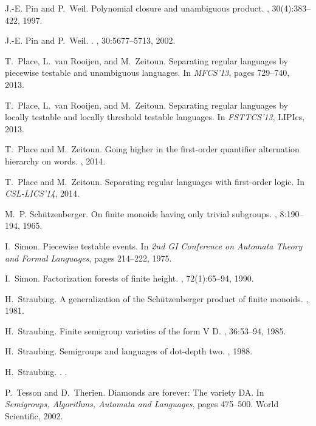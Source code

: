 \documentclass[envcountsame]{llncs}
\newcommand*{\swap}[2]{#2#1}
\begin{document}
\begin{thebibliography}{10}
J.-E. Pin and P.~Weil.
\newblock Polynomial closure and unambiguous product.
, 30(4):383--422, 1997.

J.-E. Pin and P.~Weil.
.
, 30:5677--5713, 2002.

T.~Place, L.~{\swap{Rooijen}{van }}, and M.~Zeitoun.
\newblock Separating regular languages by piecewise testable and unambiguous
  languages.
\newblock In {\em MFCS'13}, pages 729--740, 2013.

T.~Place, L.~van Rooijen, and M.~Zeitoun.
\newblock Separating regular languages by locally testable and locally
  threshold testable languages.
\newblock In {\em FSTTCS'13}, LIPIcs, 2013.

T.~Place and M.~Zeitoun.
\newblock Going higher in the first-order quantifier alternation hierarchy on
  words.
, 2014.

T.~Place and M.~Zeitoun.
\newblock Separating regular languages with first-order logic.
\newblock In {\em CSL-LICS'14}, 2014.

M.~P. Sch{\"u}tzenberger.
\newblock On finite monoids having only trivial subgroups.
, 8:190--194, 1965.

I.~Simon.
\newblock Piecewise testable events.
\newblock In {\em 2nd GI Conference on Automata Theory and Formal Languages},
  pages 214--222, 1975.

I.~Simon.
\newblock Factorization forests of finite height.
, 72(1):65--94, 1990.

H.~Straubing.
\newblock A generalization of the {S}ch{\"u}tzenberger product of finite
  monoids.
, 1981.

H.~Straubing.
\newblock Finite semigroup varieties of the form {V {\textasteriskcentered} D}.
, 36:53--94, 1985.

H.~Straubing.
\newblock Semigroups and languages of dot-depth two.
, 1988.

H.~Straubing.
.
.

P.~Tesson and D.~Therien.
\newblock Diamonds are forever: The variety {DA}.
\newblock In {\em Semigroups, Algorithms, Automata and Languages}, pages
  475--500. World Scientific, 2002.


\end{thebibliography}
\end{document}
